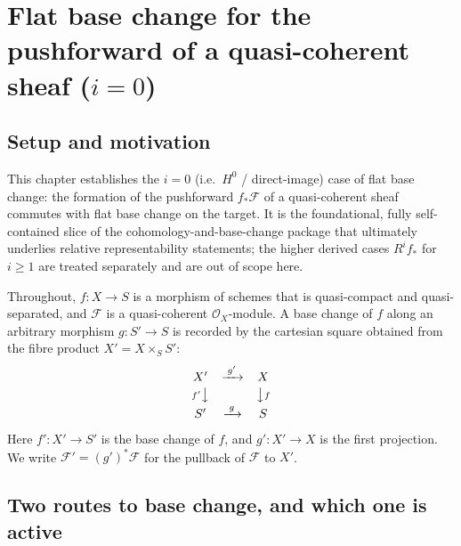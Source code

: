 \chapter{Flat base change for the pushforward of a quasi-coherent sheaf ($i=0$)}
\label{chap:Cohomology_FlatBaseChange}

\section{Setup and motivation}

This chapter establishes the $i=0$ (i.e.\ \(H^0\) / direct-image) case of flat
base change: the formation of the pushforward \(f_*\mathcal{F}\) of a
quasi-coherent sheaf commutes with flat base change on the target. It is the
foundational, fully self-contained slice of the cohomology-and-base-change
package that ultimately underlies relative representability statements; the
higher derived cases \(R^i f_*\) for \(i \geq 1\) are treated separately and are
out of scope here.

Throughout, \(f : X \to S\) is a morphism of schemes that is quasi-compact and
quasi-separated, and \(\mathcal{F}\) is a quasi-coherent \(\mathcal{O}_X\)-module.
A base change of \(f\) along an arbitrary morphism \(g : S' \to S\) is recorded
by the cartesian square obtained from the fibre product
\(X' = X \times_S S'\):
\[
  \begin{array}{ccc}
    X' & \xrightarrow{\;g'\;} & X \\[2pt]
    {\scriptstyle f'}\big\downarrow & & \big\downarrow{\scriptstyle f} \\[2pt]
    S' & \xrightarrow{\;g\;} & S
  \end{array}
\]
Here \(f' : X' \to S'\) is the base change of \(f\), and \(g' : X' \to X\) is the
first projection. We write \(\mathcal{F}' = (g')^*\mathcal{F}\) for the pullback
of \(\mathcal{F}\) to \(X'\).

\section{Two routes to base change, and which one is active}
\label{sec:fbc_route_decision}

